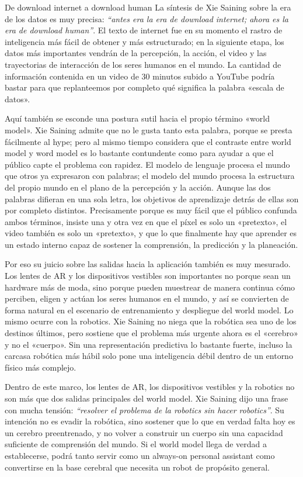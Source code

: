 \begin{importantbox}{De download internet a download human}
La síntesis de Xie Saining sobre la era de los datos es muy precisa: \textit{``antes era la era de download internet; ahora es la era de download human''}. El texto de internet fue en su momento el rastro de inteligencia más fácil de obtener y más estructurado; en la siguiente etapa, los datos más importantes vendrán de la percepción, la acción, el video y las trayectorias de interacción de los seres humanos en el mundo. La cantidad de información contenida en un video de 30 minutos subido a YouTube podría bastar para que replanteemos por completo qué significa la palabra «escala de datos».
\end{importantbox}

Aquí también se esconde una postura sutil hacia el propio término «world model». Xie Saining admite que no le gusta tanto esta palabra, porque se presta fácilmente al hype; pero al mismo tiempo considera que el contraste entre world model y word model es lo bastante contundente como para ayudar a que el público capte el problema con rapidez. El modelo de lenguaje procesa el mundo que otros ya expresaron con palabras; el modelo del mundo procesa la estructura del propio mundo en el plano de la percepción y la acción. Aunque las dos palabras difieran en una sola letra, los objetivos de aprendizaje detrás de ellas son por completo distintos. Precisamente porque es muy fácil que el público confunda ambos términos, insiste una y otra vez en que el píxel es solo un «pretexto», el video también es solo un «pretexto», y que lo que finalmente hay que aprender es un estado interno capaz de sostener la comprensión, la predicción y la planeación.

Por eso su juicio sobre las salidas hacia la aplicación también es muy mesurado. Los lentes de AR y los dispositivos vestibles son importantes no porque sean un hardware más de moda, sino porque pueden muestrear de manera continua cómo perciben, eligen y actúan los seres humanos en el mundo, y así se convierten de forma natural en el escenario de entrenamiento y despliegue del world model. Lo mismo ocurre con la robotics. Xie Saining no niega que la robótica sea uno de los destinos últimos, pero sostiene que el problema más urgente ahora es el «cerebro» y no el «cuerpo». Sin una representación predictiva lo bastante fuerte, incluso la carcasa robótica más hábil solo pone una inteligencia débil dentro de un entorno físico más complejo.

Dentro de este marco, los lentes de AR, los dispositivos vestibles y la robotics no son más que dos salidas principales del world model. Xie Saining dijo una frase con mucha tensión: \textit{``resolver el problema de la robotics sin hacer robotics''}. Su intención no es evadir la robótica, sino sostener que lo que en verdad falta hoy es un cerebro preentrenado, y no volver a construir un cuerpo sin una capacidad suficiente de comprensión del mundo. Si el world model llega de verdad a establecerse, podrá tanto servir como un always-on personal assistant como convertirse en la base cerebral que necesita un robot de propósito general.

